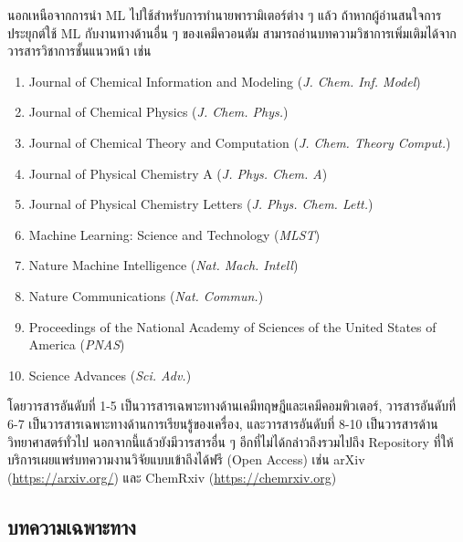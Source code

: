 นอกเหนือจากการนำ ML ไปใช้สำหรับการทำนายพารามิเตอร์ต่าง ๆ แล้ว ถ้าหากผู้อ่านสนใจการประยุกต์ใช้ ML กับงานทางด้านอื่น ๆ ของเคมีควอนตัม
สามารถอ่านบทความวิชาการเพิ่มเติมได้จากวารสารวิชาการชั้นแนวหน้า เช่น
%
\begin{enumerate}[topsep=0pt,noitemsep]\setlength\itemsep{0.5em}
    \item Journal of Chemical Information and Modeling (\textit{J. Chem. Inf. Model})

    \item Journal of Chemical Physics (\textit{J. Chem. Phys.})

    \item Journal of Chemical Theory and Computation (\textit{J. Chem. Theory Comput.})

    \item Journal of Physical Chemistry A (\textit{J. Phys. Chem. A})

    \item Journal of Physical Chemistry Letters (\textit{J. Phys. Chem. Lett.})

    \item Machine Learning: Science and Technology (\textit{MLST})

    \item Nature Machine Intelligence (\textit{Nat. Mach. Intell})

    \item Nature Communications (\textit{Nat. Commun.})

    \item Proceedings of the National Academy of Sciences of the United States of America (\textit{PNAS})

    \item Science Advances (\textit{Sci. Adv.})
\end{enumerate}

\noindent โดยวารสารอันดับที่ 1-5 เป็นวารสารเฉพาะทางด้านเคมีทฤษฎีและเคมีคอมพิวเตอร์, วารสารอันดับที่ 6-7 เป็นวารสารเฉพาะทางด้านการเรียนรู้ของเครื่อง, และวารสารอันดับที่ 8-10 เป็นวารสารด้านวิทยาศาสตร์ทั่วไป นอกจากนี้แล้วยังมีวารสารอื่น ๆ อีกที่ไม่ได้กล่าวถึงรวมไปถึง Repository ที่ให้บริการเผยแพร่บทความงานวิจัยแบบเข้าถึงได้ฟรี (Open Access) เช่น arXiv (\url{https://arxiv.org/}) และ ChemRxiv (\url{https://chemrxiv.org})

\subsection{บทความเฉพาะทาง}
\label{ssec:pred_misc_papers_specific}

